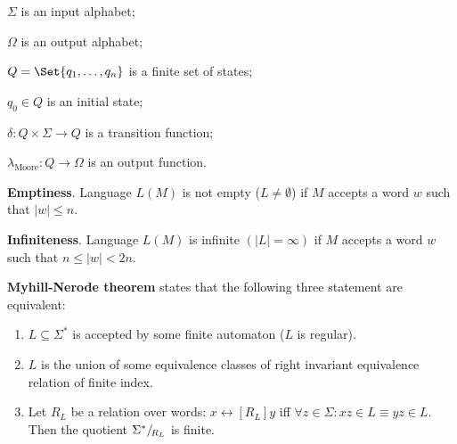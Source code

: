 \documentclass[a4paper,10pt]{article}
\begin{document}
\begin{terms}
\begin{minipage}{\linewidth}
    \begin{terms}
        \item $\Sigma$ is an input alphabet;

        \item $\Omega$ is an output alphabet;

        \item $Q = \Set{q_1, \dots, q_n}$ is a finite set of states;

        \item $q_0 \in Q$ is an initial state;

        \item $\delta \colon Q \times \Sigma \to Q$ is a transition function;

        \item $\lambda_\text{Moore} \colon Q \to \Omega$ is an output function.
    \end{terms}

    \end{minipage}

    \item \textbf{Emptiness}.
    Language $L(M)$ is not empty ($L \neq \emptyset$) if $M$ accepts a word $w$ such that $|w| \leq n$.

    \item \textbf{Infiniteness}.
    Language $L(M)$ is infinite $(|L| = \infty)$ if $M$ accepts a word $w$ such that $n \leq |w| < 2n$.

    \item \textbf{Myhill-Nerode theorem} states that the following three statement are equivalent:

    \begin{enumerate}
        \item $L \subseteq \Sigma^*$ is accepted by some finite automaton ($L$ is regular).

        \item $L$ is the union of some equivalence classes of right invariant equivalence relation of finite index.

        \item Let $R_L$ be a relation over words: $x \rel[R_L] y$ iff $\forall z \in \Sigma : xz \in L \equiv yz \in L$.
        Then the quotient $\quotient[R_L]{\Sigma^*}$ is finite.
    \end{enumerate}


\end{terms}
\end{document}

